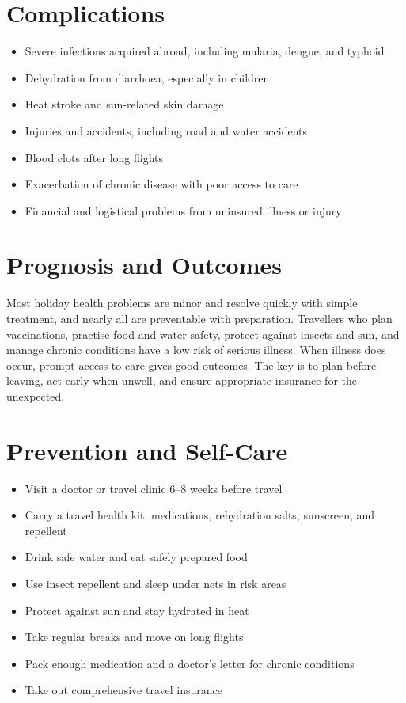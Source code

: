 \section*{Complications}
\begin{itemize}
    \item Severe infections acquired abroad, including malaria, dengue, and typhoid
    \item Dehydration from diarrhoea, especially in children
    \item Heat stroke and sun-related skin damage
    \item Injuries and accidents, including road and water accidents
    \item Blood clots after long flights
    \item Exacerbation of chronic disease with poor access to care
    \item Financial and logistical problems from uninsured illness or injury
\end{itemize}

\section*{Prognosis and Outcomes}
Most holiday health problems are minor and resolve quickly with simple treatment, and nearly all are preventable with preparation. Travellers who plan vaccinations, practise food and water safety, protect against insects and sun, and manage chronic conditions have a low risk of serious illness. When illness does occur, prompt access to care gives good outcomes. The key is to plan before leaving, act early when unwell, and ensure appropriate insurance for the unexpected.

\section*{Prevention and Self-Care}
\begin{itemize}
    \item Visit a doctor or travel clinic 6--8 weeks before travel
    \item Carry a travel health kit: medications, rehydration salts, sunscreen, and repellent
    \item Drink safe water and eat safely prepared food
    \item Use insect repellent and sleep under nets in risk areas
    \item Protect against sun and stay hydrated in heat
    \item Take regular breaks and move on long flights
    \item Pack enough medication and a doctor's letter for chronic conditions
    \item Take out comprehensive travel insurance
\end{itemize}

